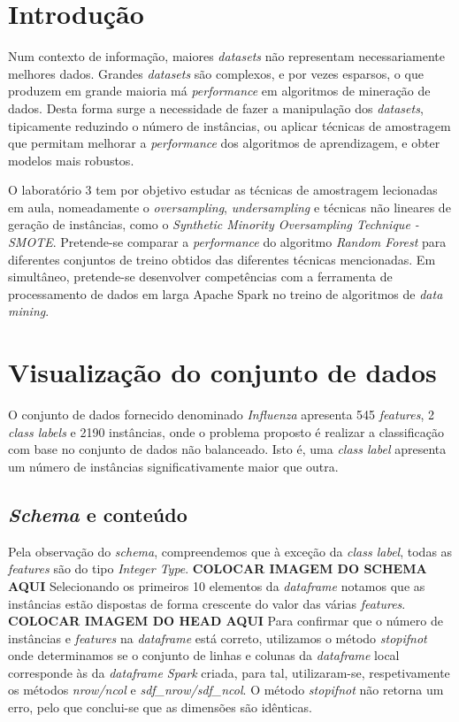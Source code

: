 \documentclass[conference]{IEEEtran}
\begin{document}
\section{Introdução}
Num contexto de informação, maiores \textit{datasets} não representam necessariamente melhores dados.
Grandes \textit{datasets} são complexos, e por vezes esparsos, o que produzem em grande maioria má \textit{performance} em algoritmos de mineração de dados. Desta forma surge a necessidade de fazer a manipulação dos \textit{datasets}, tipicamente reduzindo o número de instâncias, ou aplicar técnicas de amostragem que permitam melhorar a \textit{performance} dos algoritmos de aprendizagem, e obter modelos mais robustos. \par
O laboratório 3 tem por objetivo estudar as técnicas de amostragem lecionadas em aula, nomeadamente o \textit{oversampling}, \textit{undersampling} e técnicas não lineares de geração de instâncias, como o \textit{Synthetic Minority Oversampling Technique - SMOTE}. Pretende-se comparar a \textit{performance} do algoritmo \textit{Random Forest} para diferentes conjuntos de treino obtidos das diferentes técnicas mencionadas.
Em simultâneo, pretende-se desenvolver competências com a ferramenta de processamento de dados em larga Apache Spark no treino de algoritmos de \textit{data mining}.

\section{Visualização do conjunto de dados}
\par O conjunto de dados fornecido denominado \textit{Influenza} apresenta 545 \textit{features}, 2 \textit{class labels} e 2190 instâncias, onde o problema proposto é realizar a classificação com base no conjunto de dados não balanceado. Isto é, uma \textit{class label} apresenta um número de instâncias significativamente maior que outra.

\subsection{\textit{Schema} e conteúdo}
\par Pela observação do \textit{schema}, compreendemos que à exceção da \textit{class label}, todas as \textit{features} são do tipo \textit{Integer Type}.
\textbf{COLOCAR IMAGEM DO SCHEMA AQUI}
Selecionando os primeiros 10 elementos da \textit{dataframe} notamos que as instâncias estão dispostas de forma crescente do valor das várias \textit{features}.
\textbf{COLOCAR IMAGEM DO HEAD AQUI}
Para confirmar que o número de instâncias e \textit{features} na \textit{dataframe} está correto, utilizamos o método \textit{stopifnot} onde determinamos se o conjunto de linhas e colunas da \textit{dataframe} local corresponde às da \textit{dataframe Spark} criada, para tal, utilizaram-se, respetivamente os métodos \textit{nrow\//ncol} e \textit{sdf\_nrow\//sdf\_ncol}. O método \textit{stopifnot} não retorna um erro, pelo que conclui-se que as dimensões são idênticas. 
\end{document}
